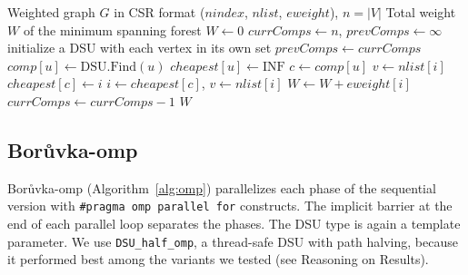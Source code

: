 \documentclass[11pt,a4paper]{article}
\begin{document}
\begin{algorithm}[H]
  \caption{Sequential Bor\r{u}vka}
  \label{alg:sequential}
  \begin{algorithmic}[1]
    \Require Weighted graph $G$ in CSR format ($nindex$, $nlist$, $eweight$), $n = |V|$
    \Ensure Total weight $W$ of the minimum spanning forest
    \State $W \gets 0$
    \State $currComps \gets n$, \; $prevComps \gets \infty$
    \State initialize a DSU with each vertex in its own set
      \State $prevComps \gets currComps$
      \Statex {}
        \State $comp[u] \gets \text{DSU.Find}(u)$
        \State $cheapest[u] \gets \text{INF}$
      \EndFor
      \Statex {}
        \State $c \gets comp[u]$
          \State $v \gets nlist[i]$
            \State $cheapest[c] \gets i$
          \EndIf
        \EndFor
      \EndFor
      \Statex {}
          \State $i \gets cheapest[c]$, \; $v \gets nlist[i]$
            \State $W \gets W + eweight[i]$
            \State $currComps \gets currComps - 1$
          \EndIf
        \EndIf
      \EndFor
    \EndWhile
    \State \Return $W$
  \end{algorithmic}
\end{algorithm}

\subsection*{Bor\r{u}vka-omp}
Bor\r{u}vka-omp (Algorithm~\ref{alg:omp}) parallelizes each phase of the sequential version with \texttt{\#pragma omp parallel for} constructs. The implicit barrier at the end of each parallel loop separates the phases. The DSU type is again a template parameter. We use \texttt{DSU\_half\_omp}, a thread-safe DSU with path halving, because it performed best among the variants we tested (see Reasoning on Results).
\end{document}
